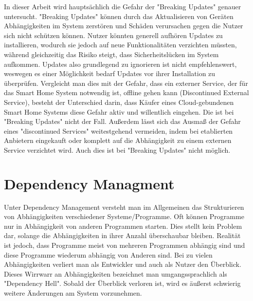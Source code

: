 In dieser Arbeit wird hauptsächlich die Gefahr der "Breaking Updates" genauer untersucht.
"Breaking Updates" können durch das Aktualisieren von Geräten Abhängigkeiten im System zerstören und Schäden verursachen gegen die Nutzer sich nicht schützen
können. Nutzer könnten generell aufhören Updates zu installieren, wodurch sie jedoch auf neue Funktionalitäten verzichten müssten, während gleichzeitig das Risiko steigt,
dass Sicherheitslücken im System aufkommen. Updates also grundlegend zu ignorieren ist nicht empfehlenswert, weswegen es einer Möglichkeit bedarf
Updates vor ihrer Installation zu überprüfen.
Vergleicht man dies mit der Gefahr, dass ein externer Service, der für das Smart Home System notwendig ist, offline gehen kann (Discontinued External Service), besteht
der Unterschied darin, dass Käufer eines Cloud-gebundenen Smart Home Systems diese Gefahr aktiv und willentlich eingehen.
Die ist bei "Breaking Updates" nicht der Fall.
Außerdem lässt sich das Ausmaß der Gefahr eines "discontinued Services" weitestgehend vermeiden, indem bei etablierten Anbietern eingekauft oder
komplett auf die Abhängigkeit zu einem externen Service verzichtet wird. Auch dies ist bei "Breaking Updates" nicht möglich.


\section{Dependency Managment}
Unter Dependency Management versteht man im Allgemeinen das Strukturieren von Abhängigkeiten verschiedener 
Systeme/Programme. Oft können Programme nur in Abhängigkeit von anderen Programmen starten.
Dies stellt kein Problem dar, solange die Abhängigkeiten in ihrer Anzahl überschaubar bleiben. 
Realität ist jedoch, dass Programme meist von mehreren Programmen abhängig sind und diese
Programme wiederum abhängig von Anderen sind. Bei zu vielen Abhängigkeiten verliert man 
als Entwickler und auch als Nutzer den Überblick. Dieses Wirrwarr an Abhängigkeiten bezeichnet man umgangssprachlich 
als "Dependency Hell". Sobald der Überblick verloren ist, wird es äußerst schwierig weitere Änderungen am
System vorzunehmen.

